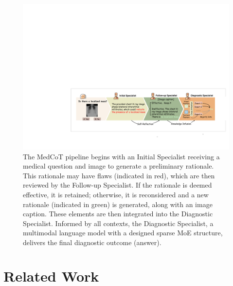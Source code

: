 \documentclass[11pt]{article}
\begin{document}
\begin{figure}
\centering
\includegraphics[width=\textwidth]{image/Figure_pipeline_v7.pdf}
\caption{
The MedCoT pipeline begins with an Initial Specialist receiving a medical question and image to generate a preliminary rationale. This rationale may have flaws (indicated in red), which are then reviewed by the Follow-up Specialist. If the rationale is deemed effective, it is retained; otherwise, it is reconsidered and a new rationale (indicated in green) is generated, along with an image caption. These elements are then integrated into the Diagnostic Specialist. Informed by all contexts, the Diagnostic Specialist, a multimodal language model with a designed sparse MoE structure, delivers the final diagnostic outcome (answer).
} 
\label{MedCoT pipeline}
\vspace{-1em}
\end{figure}

\section{Related Work}
\vspace{-0.5em}
\end{document}
